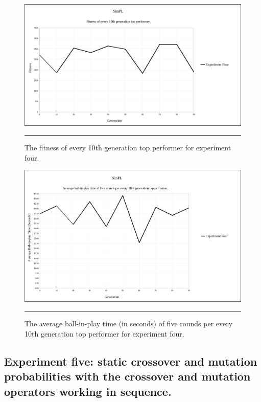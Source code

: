 \begin{figure}[ht!]  
  \centering
  \includegraphics[width=5in]{../Figures/Chapter3/exp4_10_tops.png}
  \rule{35em}{0.5pt}
  \caption[Experiment Four Top Performers]{The fitness of every 10th generation top performer for experiment four.}
  \label{fig:exp4_10_tops}
\end{figure}

\begin{figure}[ht!]  
  \centering
  \includegraphics[width=5in]{../Figures/Chapter3/exp4_10_tops_times.png}
  \rule{35em}{0.5pt}
  \caption[Experiment Four Top Performers Tournament]{The average ball-in-play time (in seconds) of five rounds per every 10th generation top performer for experiment four.}
  \label{fig:exp4_10_tops_times}
\end{figure}

\subsection[Experiment Five]{Experiment five: static crossover and mutation probabilities with the crossover and mutation operators working in sequence.}

